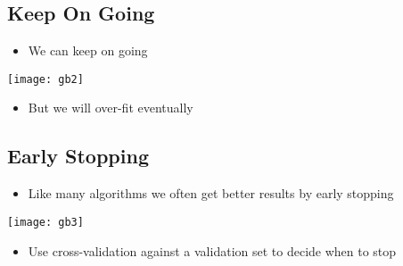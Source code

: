 
\begin{slide}
\section{Keep On Going}
\pb
\begin{itemize}
\item We can keep on going
\end{itemize}
\begin{center}
  \texttt{[image: gb2]}\pauseh
\end{center}
\begin{itemize}
\item But we will over-fit eventually\pause
\end{itemize}
\end{slide}


\begin{slide}
\section{Early Stopping}

\pb
\begin{itemize}
\item Like many algorithms we often get better results by early
  stopping\pauseh
\end{itemize}
\begin{center}
  \texttt{[image: gb3]}
\end{center}
\begin{itemize}
\item Use cross-validation against a validation set to decide when to
  stop\pauseh
\end{itemize}

\end{slide}



